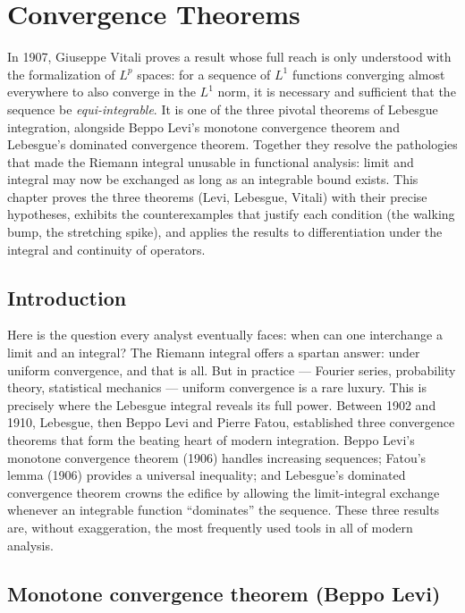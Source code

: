 \chapter{Convergence Theorems}
\label{ch:convergence}

In 1907, Giuseppe Vitali proves a result whose full reach is only understood with the formalization of $L^p$ spaces: for a sequence of $L^1$ functions converging almost everywhere to also converge in the $L^1$ norm, it is necessary and sufficient that the sequence be \emph{equi-integrable}. It is one of the three pivotal theorems of Lebesgue integration, alongside Beppo Levi's monotone convergence theorem and Lebesgue's dominated convergence theorem. Together they resolve the pathologies that made the Riemann integral unusable in functional analysis: limit and integral may now be exchanged as long as an integrable bound exists. This chapter proves the three theorems (Levi, Lebesgue, Vitali) with their precise hypotheses, exhibits the counterexamples that justify each condition (the walking bump, the stretching spike), and applies the results to differentiation under the integral and continuity of operators.

\section{Introduction}

Here is the question every analyst eventually faces: when can one interchange a limit and an integral? The Riemann integral offers a spartan answer: under uniform convergence, and that is all. But in practice --- Fourier series, probability theory, statistical mechanics --- uniform convergence is a rare luxury. This is precisely where the Lebesgue integral reveals its full power. Between 1902 and 1910, Lebesgue, then Beppo Levi and Pierre Fatou, established three convergence theorems that form the beating heart of modern integration. Beppo Levi's monotone convergence theorem (1906) handles increasing sequences; Fatou's lemma (1906) provides a universal inequality; and Lebesgue's dominated convergence theorem crowns the edifice by allowing the limit-integral exchange whenever an integrable function ``dominates'' the sequence. These three results are, without exaggeration, the most frequently used tools in all of modern analysis.

\section{Monotone convergence theorem (Beppo Levi)}

